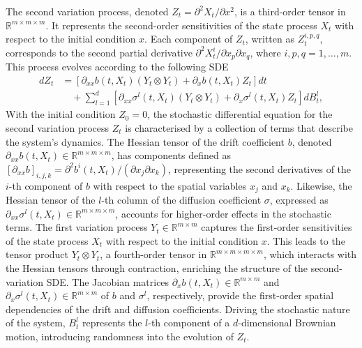 \documentclass[]{interact}
\newcommand{\1}{\mathbf{1}}
\theoremstyle{plain}%
\theoremstyle{definition}
\theoremstyle{remark}
\numberwithin{equation}{section}
\begin{document}
The second variation process, denoted \(Z_t = \partial^2 X_t/\partial x^2\), is a third-order tensor in \(\mathbb{R}^{m \times m \times m}\). It represents the second-order sensitivities of the state process \(X_t\) with respect to the initial condition \(x\). Each component of \(Z_t\), written as \(Z_t^{i,p,q}\), corresponds to the second partial derivative \(\partial^2 X_t^i/\partial x_p \partial x_q\), where \(i, p, q = 1, \ldots, m\). This process evolves according to the following SDE
\begin{align*}
dZ_t &= \left[ \partial_{xx} b(t, X_t) (Y_t \otimes Y_t) + \partial_x b(t, X_t) Z_t \right] dt \\
&\quad + \sum_{l=1}^d \left[ \partial_{xx} \sigma^l(t, X_t) (Y_t \otimes Y_t) + \partial_x \sigma^l(t, X_t) Z_t \right] dB_t^l,
\end{align*}
With the initial condition \( Z_0 = 0 \), the stochastic differential equation for the second variation process \( Z_t \) is characterised by a collection of terms that  describe the system's dynamics. The Hessian tensor of the drift coefficient \( b \), denoted \( \partial_{xx} b(t, X_t) \in \mathbb{R}^{m \times m \times m} \), has components defined as \( \left[ \partial_{xx} b \right]_{i,j,k} = \partial^2 b^i(t, X_t) /(\partial x_j \partial x_k)\), representing the second derivatives of the \( i \)-th component of \( b \) with respect to the spatial variables \( x_j \) and \( x_k \). Likewise, the Hessian tensor of the \( l \)-th column of the diffusion coefficient \( \sigma \), expressed as \( \partial_{xx} \sigma^l(t, X_t) \in \mathbb{R}^{m \times m \times m} \), accounts for higher-order effects in the stochastic terms. The first variation process \( Y_t \in \mathbb{R}^{m \times m} \) captures the first-order sensitivities of the state process \( X_t \) with respect to the initial condition \( x \). This leads to the tensor product \( Y_t \otimes Y_t \), a fourth-order tensor in \( \mathbb{R}^{m \times m \times m \times m} \), which interacts with the Hessian tensors through contraction, enriching the structure of the second-variation SDE. The Jacobian matrices \( \partial_x b(t, X_t) \in \mathbb{R}^{m \times m} \) and \( \partial_x \sigma^l(t, X_t) \in \mathbb{R}^{m \times m} \) of \( b \) and \( \sigma^l \), respectively, provide the first-order spatial dependencies of the drift and diffusion coefficients. Driving the stochastic nature of the system, \( B_t^l \) represents the \( l \)-th component of a \( d \)-dimensional Brownian motion, introducing randomness into the evolution of \( Z_t \).
\end{document}
